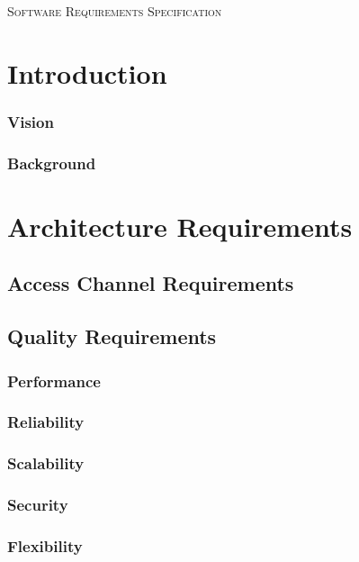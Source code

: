 \documentclass[a4paper,12pt]{report}
\begin{document}
\renewcommand{\thesection}{\arabic{section}}
\newpage
\begin{center}
\textsc{\LARGE Software Requirements Specification}\\[1.5cm]
\end{center}



\section{Introduction}

 \subsubsection{Vision}
 
\subsubsection{Background}
	
\section{Architecture Requirements}
\subsection{Access Channel Requirements}

\subsection{Quality Requirements}
\subsubsection{Performance}

\subsubsection{Reliability}


\subsubsection{Scalability}

\subsubsection{Security}

\subsubsection{Flexibility}
\end{document}
